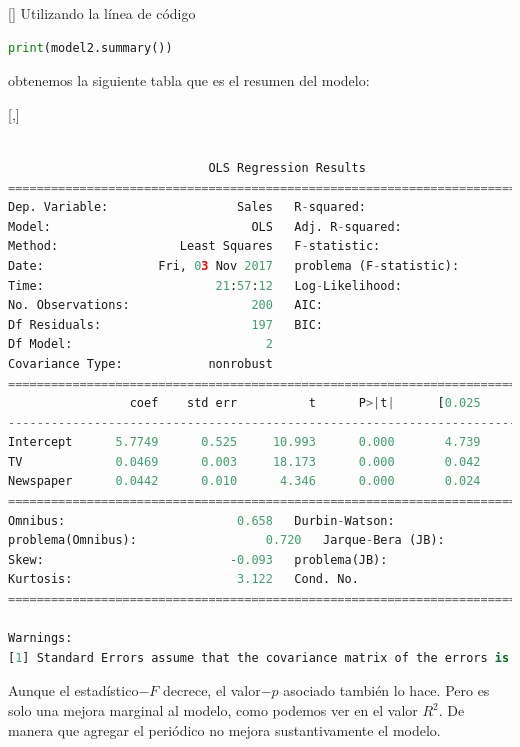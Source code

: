 []
Utilizando la línea de código
\begin{lstlisting}[language=Python]
 print(model2.summary())
\end{lstlisting} obtenemos la siguiente tabla que es el resumen del modelo:


[,]{} 
\begin{lstlisting}[language=Python]

                            OLS Regression Results
==============================================================================
Dep. Variable:                  Sales   R-squared:                       0.646
Model:                            OLS   Adj. R-squared:                  0.642
Method:                 Least Squares   F-statistic:                     179.6
Date:                Fri, 03 Nov 2017   problema (F-statistic):           3.95e-45
Time:                        21:57:12   Log-Likelihood:                -509.89
No. Observations:                 200   AIC:                             1026.
Df Residuals:                     197   BIC:                             1036.
Df Model:                           2
Covariance Type:            nonrobust
==============================================================================
                 coef    std err          t      P>|t|      [0.025      0.975]
------------------------------------------------------------------------------
Intercept      5.7749      0.525     10.993      0.000       4.739       6.811
TV             0.0469      0.003     18.173      0.000       0.042       0.052
Newspaper      0.0442      0.010      4.346      0.000       0.024       0.064
==============================================================================
Omnibus:                        0.658   Durbin-Watson:                   1.969
problema(Omnibus):                  0.720   Jarque-Bera (JB):                0.415
Skew:                          -0.093   problema(JB):                        0.813
Kurtosis:                       3.122   Cond. No.                         410.
==============================================================================

Warnings:
[1] Standard Errors assume that the covariance matrix of the errors is correctly specified.
\end{lstlisting}


Aunque el estadístico$-F$ decrece, el valor$-p$ asociado también lo hace. Pero es solo una mejora marginal al modelo, como podemos ver en el valor $R^{2}.$ De manera que agregar el periódico no mejora sustantivamente el modelo.

